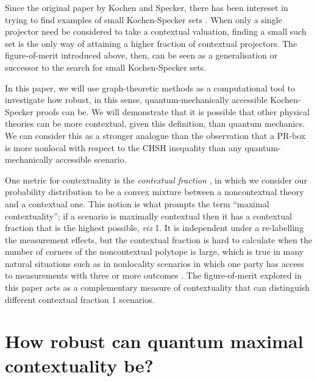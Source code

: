 \documentclass{amsart}
\theoremstyle{definition}
\begin{document}
Since the original paper by Kochen and Specker, there has been intereset in trying to find examples of small Kochen-Specker sets \cite{Aren2011}. When only a single projector need be considered to take a contextual valuation, finding a small such set is the only way of attaining a higher fraction of contextual projectors. The figure-of-merit introduced above, then, can be seen as a generalisation or successor to the search for small Kochen-Specker sets.

In this paper, we will use graph-theoretic methods as a computational tool to investigate how robust, in this sense, quantum-mechanically accessible Kochen-Specker proofs can be. We will demonstrate that it is possible that other physical theories can be more contextual, given this definition, than quantum mechanics. We can consider this as a stronger analogue than the observation that a PR-box is more nonlocal with respect to the CHSH inequality than any quantum-mechanically accessible scenario.

One metric for contextuality is the \emph{contextual fraction} \cite{Abra2017}, in which we consider our probability distribution to be a convex mixture between a noncontextual theory and a contextual one. This notion is what prompts the term ``maximal contextuality''; if a scenario is maximally contextual then it has a contextual fraction that is the highest possible, \emph{viz} 1. It is independent under a  re-labelling the measurement effects, but the contextual fraction is hard to calculate when the number of corners of the noncontextual polytope is large, which is true in many natural situations such as in nonlocality scenarios in which one party has access to measurements with three or more outcomes \cite{SimmCC}. The figure-of-merit explored in this paper acts as a complementary measure of contextuality that can distinguish different contextual fraction 1 scenarios.




\section{How robust can quantum maximal contextuality be?}
\end{document}
